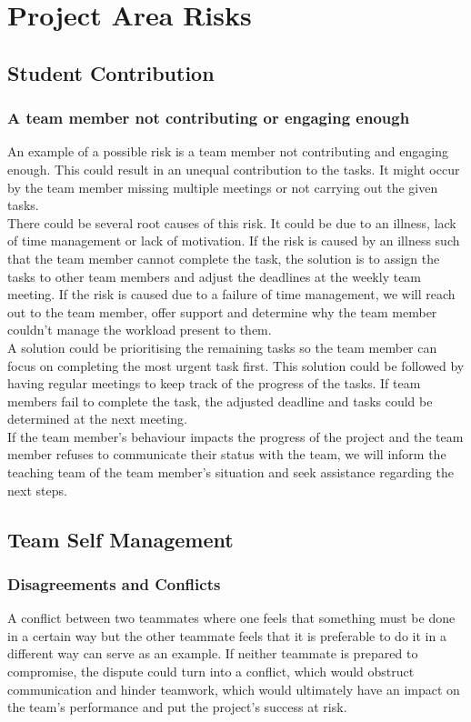 \renewcommand\thesection{\arabic{section}}
\section{Project Area Risks}    

\subsection{Student Contribution}
\subsubsection{A team member not contributing or engaging enough}

An example of a possible risk is a team member not contributing and engaging enough. This could result in an unequal contribution to the tasks. It might occur by the team member missing multiple meetings or not carrying out the given tasks.
\\

There could be several root causes of this risk. It could be due to an illness, lack of time management or lack of motivation. If the risk is caused by an illness such that the team member cannot complete the task, the solution is to assign the tasks to other team members and adjust the deadlines at the weekly team meeting. If the risk is caused due to a failure of time management, we will reach out to the team member, offer support and determine why the team member couldn’t manage the workload present to them. 
\\

A solution could be prioritising the remaining tasks so the team member can focus on completing the most urgent task first. This solution could be followed by having regular meetings to keep track of the progress of the tasks. If team members fail to complete the task, the adjusted deadline and tasks could be determined at the next meeting. 
\\

If the team member's behaviour impacts the progress of the project and the team member refuses to communicate their status with the team, we will inform the teaching team of the team member’s situation and seek assistance regarding the next steps. 


\subsection{Team Self Management}
\subsubsection{Disagreements and Conflicts}
A conflict between two teammates where one feels that something must be done in a certain way but the other teammate feels that it is preferable to do it in a different way can serve as an example. If neither teammate is prepared to compromise, the dispute could turn into a conflict, which would obstruct communication and hinder teamwork, which would ultimately have an impact on the team's performance and put the project's success at risk.
\\

